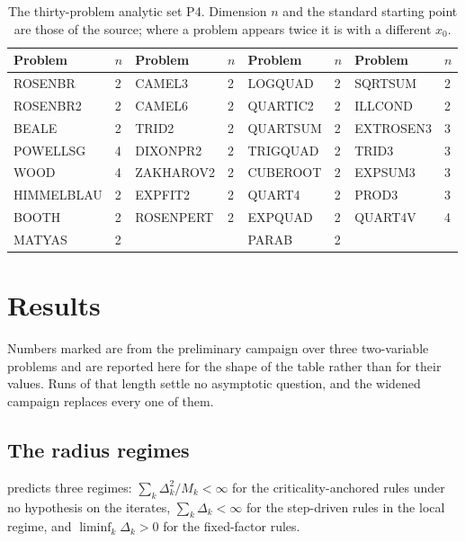 \documentclass[11pt]{article}
\theoremstyle{plain}
\theoremstyle{definition}
\theoremstyle{remark}
\numberwithin{equation}{section}
\begin{document}
\begin{table}[htbp]
  \centering
  \caption{The thirty-problem analytic set P4. Dimension $n$ and the standard starting point are
           those of the source; where a problem appears twice it is with a different $x_0$.}
  \label{tab: analytic set}
  \scriptsize
  \begin{tabular}{llllllll}
    \toprule
    Problem & $n$ & Problem & $n$ & Problem & $n$ & Problem & $n$ \\
    \midrule
    ROSENBR    & 2 & CAMEL3    & 2 & LOGQUAD   & 2 & SQRTSUM   & 2 \\
    ROSENBR2   & 2 & CAMEL6    & 2 & QUARTIC2  & 2 & ILLCOND   & 2 \\
    BEALE      & 2 & TRID2     & 2 & QUARTSUM  & 2 & EXTROSEN3 & 3 \\
    POWELLSG   & 4 & DIXONPR2  & 2 & TRIGQUAD  & 2 & TRID3     & 3 \\
    WOOD       & 4 & ZAKHAROV2 & 2 & CUBEROOT  & 2 & EXPSUM3   & 3 \\
    HIMMELBLAU & 2 & EXPFIT2   & 2 & QUART4    & 2 & PROD3     & 3 \\
    BOOTH      & 2 & ROSENPERT & 2 & EXPQUAD   & 2 & QUART4V   & 4 \\
    MATYAS     & 2 &           &   & PARAB     & 2 &           &   \\
    \bottomrule
  \end{tabular}
\end{table}

\section{Results}
\label{sec: results}
\label{sec: experiments}

Numbers marked \provisional{} are from the preliminary campaign over three
two-variable problems and are reported here for the shape of the table rather
than for their values. Runs of that length settle no asymptotic question, and the
widened campaign replaces every one of them.


\subsection{The radius regimes}
\label{sec: res asymptotics}

\PartII{} predicts three regimes: $\sum_k \Delta_k^2/M_k < \infty$ for the
criticality-anchored rules under no hypothesis on the iterates,
$\sum_k \Delta_k < \infty$ for the step-driven rules in the local regime, and
$\liminf_k \Delta_k > 0$ for the fixed-factor rules.
\end{document}
